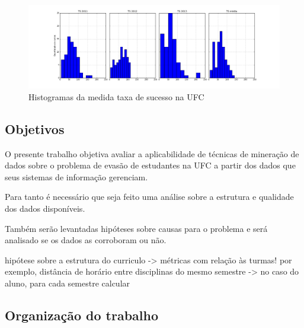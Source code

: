 \begin{figure}
\caption{Histogramas da medida taxa de sucesso na UFC}
\includegraphics[scale=0.4, trim=60mm 0mm 0mm 0mm]{taxa-de-sucesso-ufc-hist}
\end{figure}



\subsection{Objetivos}
O presente trabalho objetiva avaliar a aplicabilidade de técnicas de mineração de dados sobre o problema de evasão de estudantes na UFC a partir dos dados que seus sistemas de informação gerenciam.  

Para tanto é necessário que seja feito uma análise sobre a estrutura e qualidade dos dados disponíveis.

Também serão levantadas hipóteses sobre causas para o problema e será analisado se os dados as corroboram ou não.

hipótese sobre a estrutura do curriculo -> métricas com relação às turmas! por exemplo, distância de horário entre disciplinas do mesmo semestre -> no caso do aluno, para cada semestre calcular

\subsection{Organização do trabalho}

